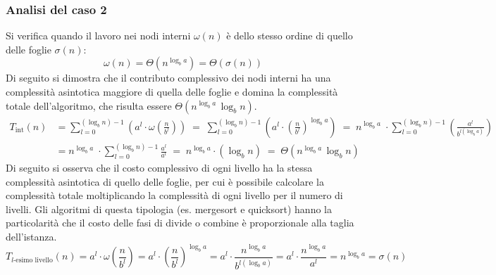 \subsubsection*{Analisi del caso 2}
Si verifica quando il lavoro nei nodi interni \(\omega(n)\) è dello stesso ordine di quello delle foglie \(\sigma(n)\):
\[\omega(n) = \Theta(n^{\log_b a}) = \Theta (\sigma(n))\]
Di seguito si dimostra che il contributo complessivo dei nodi interni ha una complessità asintotica maggiore di quella delle
foglie e domina la complessità totale dell'algoritmo, che risulta essere \(\Theta(n^{\log_b a} \, \log_b n)\).
\begin{align*}
	T_{\text{int}}(n) &= \sum_{l=0}^{(\log_b n) - 1} \left( a^l \cdot \omega \! \left( \frac{n}{b^l} \right) \right) \; = \; \sum_{l=0}^{(\log_b n) - 1} \left( a^l \cdot \left( \frac{n}{b^l} \right)^{\log_b a} \right) \; = \; n^{\log_b a} \; \cdot \!\! \sum_{l=0}^{(\log_b n) - 1} \left( \frac{a^l}{b^{l (\log_b a)}} \right) \\[3pt]
	&= n^{\log_b a} \; \cdot \!\! \sum_{l=0}^{(\log_b n) - 1} \frac{a^l}{a^l} \; = \; n^{\log_b a} \cdot (\log_b n) \; = \; \Theta(n^{\log_b a} \, \log_b n)
\end{align*}
Di seguito si osserva che il costo complessivo di ogni livello ha la stessa complessità asintotica di quello delle foglie,
per cui è possibile calcolare la complessità totale moltiplicando la complessità di ogni livello per il numero di livelli.
Gli algoritmi di questa tipologia (es. mergesort e quicksort) hanno la particolarità che il costo delle fasi di divide o
combine è proporzionale alla taglia dell'istanza.
\[T_{\text{\(l\)-esimo livello}}(n) = a^l \cdot \omega \! \left( \frac{n}{b^l} \right) = a^l \cdot \left( \frac{n}{b^l} \right)^{\log_b a} = a^l \cdot \frac{n^{\log_b a}}{b^{l (\log_b a)}} = a^l \cdot \frac{n^{\log_b a}}{a^l} = n^{\log_b a} = \sigma(n)\]

\newpage

